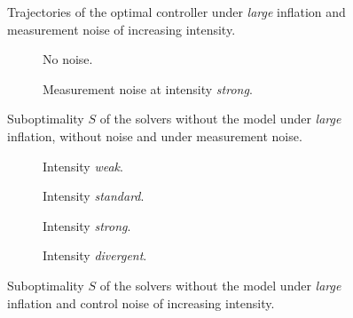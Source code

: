\begin{figure}[htbp]
  \centering
  \caption{Trajectories of the optimal controller under \emph{large} inflation and measurement noise of
    increasing intensity.}
  \label{fig:ch4-noise-large-traj-levels-baseline}
\end{figure}

\begin{figure}[htbp]
  \centering
  \begin{subfigure}[t]{0.49\linewidth}
    \centering
    \caption{No noise.}
    \label{fig:ch4-noise-large-clean}
  \end{subfigure}\hfill
  \begin{subfigure}[t]{0.49\linewidth}
    \centering
    \caption{Measurement noise at intensity \emph{strong}.}
    \label{fig:ch4-noise-large-measurement-strong}
  \end{subfigure}
  \caption{Suboptimality $S$ of the solvers without the model under \emph{large} inflation,
    without noise and under measurement noise.}
  \label{fig:ch4-noise-large-measurement}
\end{figure}

\begin{figure}[htbp]
  \centering
  \begin{subfigure}[t]{0.49\linewidth}
    \centering
    \caption{Intensity \emph{weak}.}
    \label{fig:ch4-noise-large-control-weak}
  \end{subfigure}\hfill
  \begin{subfigure}[t]{0.49\linewidth}
    \centering
    \caption{Intensity \emph{standard}.}
    \label{fig:ch4-noise-large-control-standard}
  \end{subfigure}

  \medskip
  \begin{subfigure}[t]{0.49\linewidth}
    \centering
    \caption{Intensity \emph{strong}.}
    \label{fig:ch4-noise-large-control-strong}
  \end{subfigure}\hfill
  \begin{subfigure}[t]{0.49\linewidth}
    \centering
    \caption{Intensity \emph{divergent}.}
    \label{fig:ch4-noise-large-control-divergent}
  \end{subfigure}
  \caption{Suboptimality $S$ of the solvers without the model under \emph{large} inflation
    and control noise of increasing intensity.}
  \label{fig:ch4-noise-large-control}
\end{figure}

